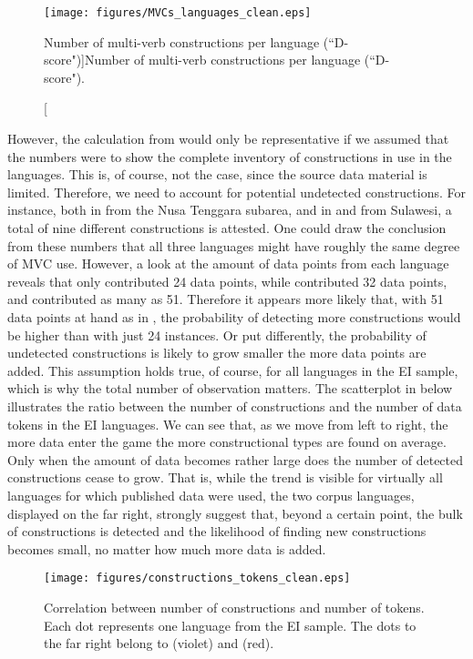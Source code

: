 \begin{figure}
\texttt{[image: figures/MVCs\_languages\_clean.eps]}
\caption[Number of multi-verb constructions per language (``D-score")]{Number of multi-verb constructions per language (``D-score").}\label{fig:number_types}
\end{figure}

\largerpage[-1]
However, the calculation from  would only be representative if we assumed that the numbers were to show the complete inventory of constructions in use in the languages. This is, of course, not the case, since the source data material is limited. Therefore, we need to account for potential undetected constructions. For instance, both in  from the Nusa Tenggara subarea, and in  and  from Sulawesi, a total of nine different constructions is attested. One could draw the conclusion from these numbers that all three languages might have roughly the same degree of MVC use. However, a look at the amount of data points from each language reveals that  only contributed 24 data points, while  contributed 32 data points, and  contributed as many as 51. Therefore it appears more likely that, with 51 data points at hand as in , the probability of detecting more constructions would be higher than with just 24 instances. Or put differently, the probability of undetected constructions is likely to grow smaller the more data points are added. This assumption holds true, of course, for all languages in the EI sample, which is why the total number of observation matters. The scatterplot in  below illustrates the ratio between the number of constructions and the number of data tokens in the EI languages. We can see that, as we move from left to right, the more data enter the game the more constructional types are found on average. Only when the amount of data becomes rather large does the number of detected constructions cease to grow. That is, while the trend is visible for virtually all languages for which published data were used, the two corpus languages, displayed on the far right, strongly suggest that, beyond a certain point, the bulk of constructions is detected and the likelihood of finding new constructions becomes small, no matter how much more data is added.

\begin{figure}
\texttt{[image: figures/constructions\_tokens\_clean.eps]}
\caption[Correlation between number of constructions and number of tokens]{Correlation between number of constructions and number of tokens. Each dot represents one language from the EI sample. The dots to the far right belong to  (violet) and  (red).}\label{fig:constructions_tokens}
\end{figure}

